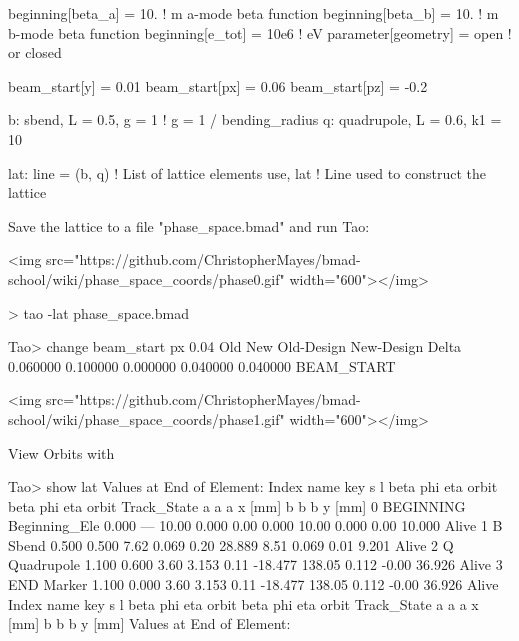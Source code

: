 \documentclass{hitec}
\begin{document}
    beginning[beta_a] = 10.     ! m  a-mode beta function
    beginning[beta_b] = 10.     ! m  b-mode beta function
    beginning[e_tot] = 10e6     ! eV
    parameter[geometry] = open  ! or closed

    beam_start[y] = 0.01
    beam_start[px] = 0.06
    beam_start[pz] = -0.2

    b: sbend, L = 0.5, g = 1    ! g = 1 / bending_radius
    q: quadrupole, L = 0.6, k1 = 10

    lat: line = (b, q)      ! List of lattice elements
    use, lat                ! Line used to construct the lattice

Save the lattice to a file "phase_space.bmad" and run Tao:

<img src="https://github.com/ChristopherMayes/bmad-school/wiki/phase_space_coords/phase0.gif" width="600"></img>

    > tao -lat phase_space.bmad

    Tao> change beam_start px 0.04
               Old           New    Old-Design    New-Design         Delta
          0.060000      0.100000      0.000000      0.040000      0.040000    BEAM_START


<img src="https://github.com/ChristopherMayes/bmad-school/wiki/phase_space_coords/phase1.gif" width="600"></img>

View Orbits with 

    Tao> show lat
          Values at End of Element:
     Index  name      key                       s       l    beta     phi    eta  orbit     beta     phi    eta  orbit    Track_State
                                                                a       a      a  x [mm]       b       b      b  y [mm]
         0  BEGINNING Beginning_Ele         0.000     ---   10.00   0.000   0.00   0.000   10.00   0.000   0.00  10.000   Alive
         1  B         Sbend                 0.500   0.500    7.62   0.069   0.20  28.889    8.51   0.069   0.01   9.201   Alive
         2  Q         Quadrupole            1.100   0.600    3.60   3.153   0.11 -18.477  138.05   0.112  -0.00  36.926   Alive
         3  END       Marker                1.100   0.000    3.60   3.153   0.11 -18.477  138.05   0.112  -0.00  36.926   Alive
     Index  name      key                       s       l    beta     phi    eta  orbit     beta     phi    eta  orbit    Track_State
                                                                a       a      a  x [mm]       b       b      b  y [mm]
          Values at End of Element:
\end{document}
